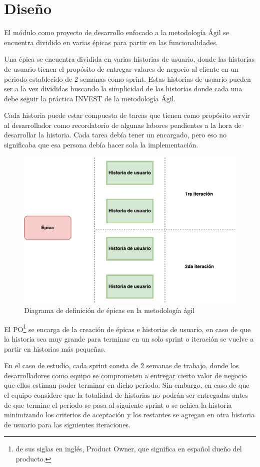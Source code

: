 \section{Diseño}
El módulo como proyecto de desarrollo enfocado a la metodología Ágil se encuentra dividido en varias épicas para partir en las funcionalidades.

Una épica se encuentra dividida en varias historias de usuario, donde las historias de usuario tienen el propósito de entregar valores de negocio al cliente en un periodo establecido de 2 semanas como sprint. Estas historias de usuario pueden ser a la vez divididas buscando la simplicidad de las historias donde cada una debe seguir la práctica INVEST de la metodología Ágil.

Cada historia puede estar compuesta de tareas que tienen como propósito servir al desarrollador como recordatorio de algunas labores pendientes a la hora de desarrollar la historia. Cada tarea debía tener un encargado, pero eso no significaba que esa persona debía hacer sola la implementación.

\begin{figure}[H]
\centering
\includegraphics[width=125mm,scale=1]{Capitulos/PropuestadeSolucion/Imagenes/epic_diagram}
\caption{Diagrama de definición de épicas en la metodología ágil}
  \label{epic}
\end{figure}

El PO\footnote{de sus siglas en inglés, Product Owner, que significa en español dueño del producto.} se encarga de la creación de épicas e historias de usuario, en caso de que la historia sea muy grande para terminar en un solo sprint o iteración se vuelve a partir en historias más pequeñas. 

En el caso de estudio, cada sprint consta de 2 semanas de trabajo, donde los desarrolladores como equipo se comprometen a entregar cierto valor de negocio que ellos estiman poder terminar en dicho periodo. Sin embargo, en caso de que el equipo considere que la totalidad de historias no podrán ser entregadas antes de que termine el periodo se pasa al siguiente sprint o se achica la historia minimizando los criterios de aceptación y los restantes se agregan en otra historia de usuario para las siguientes iteraciones.

